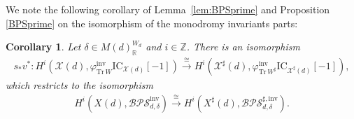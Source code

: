 \documentclass [11pt,oneside,a4paper,mathscr]{amsart}
\newtheorem{cor}[thm]{Corollary}
\theoremstyle{definition}
\newcommand{\X}{\mathscr{X}}
\begin{document}
We note the following corollary of Lemma~\ref{lem:BPSprime} and Proposition \ref{BPSprime}
on the isomorphism of the monodromy invariants parts: 

\begin{cor}\label{corBPSprime}
Let $\delta\in M(d)^{W_d}_\mathbb{R}$ and $i\in\mathbb{Z}$. 
There is an isomorphism
\begin{align*}
    s_*v^*\colon H^i(\X(d), \varphi^{\mathrm{inv}}_{\mathrm{Tr}\,W}\mathrm{IC}_{\X(d)}[-1])\xrightarrow{\cong} H^i(\X^\sharp(d), \varphi^{\mathrm{inv}}_{\mathrm{Tr}\,W^\sharp}\mathrm{IC}_{\X^\sharp(d)}[-1]),
    \end{align*}
    which restricts to the isomorphism 
    \begin{align*}
    H^i(X(d), \mathcal{BPS}^{\mathrm{inv}}_{d,\delta})\xrightarrow{\cong} H^i(X^\sharp(d), \mathcal{BPS}^{\sharp, \mathrm{inv}}_{d,\delta}).
\end{align*}
\end{cor}
\end{document}
